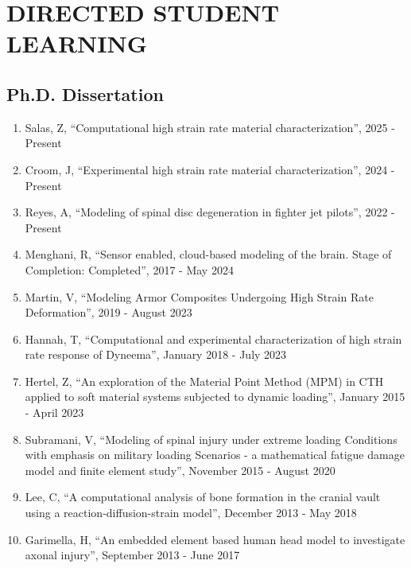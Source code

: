 \documentclass[a4paper,10pt]{article}
\begin{document}
\section*{DIRECTED STUDENT LEARNING}
\subsection*{Ph.D. Dissertation}
\begin{enumerate}
\item Salas, Z, ``Computational high strain rate material characterization'', 2025 - Present
\item Croom, J, ``Experimental high strain rate material characterization'', 2024 - Present
\item Reyes, A, ``Modeling of spinal disc degeneration in fighter jet pilots'', 2022 - Present
\item Menghani, R, ``Sensor enabled, cloud-based modeling of the brain. Stage of Completion: Completed'', 2017 - May 2024
\item Martin, V, ``Modeling Armor Composites Undergoing High Strain Rate Deformation'', 2019 - August 2023
\item Hannah, T, ``Computational and experimental characterization of high strain rate response of Dyneema'', January 2018 - July 2023
\item Hertel, Z, ``An exploration of the Material Point Method (MPM) in CTH applied to soft material systems subjected to dynamic loading'', January 2015 - April 2023
\item Subramani, V, ``Modeling of spinal injury under extreme loading Conditions with emphasis on military loading Scenarios - a mathematical fatigue damage model and finite element study'', November 2015 - August 2020
\item Lee, C, ``A computational analysis of bone formation in the cranial vault using a reaction-diffusion-strain model'', December 2013 - May 2018
\item Garimella, H, ``An embedded element based human head model to investigate axonal injury'', September 2013 - June 2017
\end{enumerate}
\end{document}
